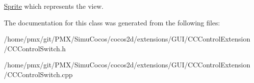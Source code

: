 \hyperlink{classSprite}{Sprite} which represents the view. 

The documentation for this class was generated from the following files\+:\begin{DoxyCompactItemize}
\item 
/home/pmx/git/\+P\+M\+X/\+Simu\+Cocos/cocos2d/extensions/\+G\+U\+I/\+C\+C\+Control\+Extension/C\+C\+Control\+Switch.\+h\item 
/home/pmx/git/\+P\+M\+X/\+Simu\+Cocos/cocos2d/extensions/\+G\+U\+I/\+C\+C\+Control\+Extension/C\+C\+Control\+Switch.\+cpp\end{DoxyCompactItemize}
